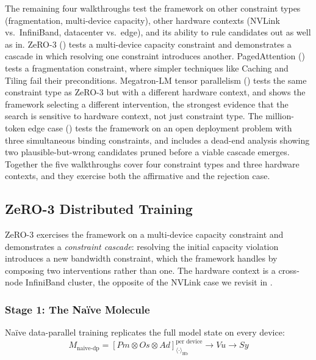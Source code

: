 \documentclass[10pt,twocolumn]{article}
\begin{document}
The remaining four walkthroughs test the framework on other constraint types (fragmentation, multi-device capacity), other hardware contexts (NVLink vs.\ InfiniBand, datacenter vs.\ edge), and its ability to rule candidates out as well as in. ZeRO-3 () tests a multi-device capacity constraint and demonstrates a cascade in which resolving one constraint introduces another. PagedAttention () tests a fragmentation constraint, where simpler techniques like Caching and Tiling fail their preconditions. Megatron-LM tensor parallelism () tests the same constraint type as ZeRO-3 but with a different hardware context, and shows the framework selecting a different intervention, the strongest evidence that the search is sensitive to hardware context, not just constraint type. The million-token edge case () tests the framework on an open deployment problem with three simultaneous binding constraints, and includes a dead-end analysis showing two plausible-but-wrong candidates pruned before a viable cascade emerges. Together the five walkthroughs cover four constraint types and three hardware contexts, and they exercise both the affirmative and the rejection case.

\subsection{ZeRO-3 Distributed Training}
\label{sec:zero-3}

ZeRO-3 \citep{rajbhandari2020} exercises the framework on a multi-device capacity constraint and demonstrates a \emph{constraint cascade}: resolving the initial capacity violation introduces a new bandwidth constraint, which the framework handles by composing two interventions rather than one. The hardware context is a cross-node InfiniBand cluster, the opposite of the NVLink case we revisit in .

\subsubsection{Stage 1: The Na\"ive Molecule}

Na\"ive data-parallel training replicates the full model state on every device:
\begin{equation*}
M_{\text{naive-dp}} = [Pm \otimes Os \otimes Ad]_{\langle \cdot \rangle_{\text{Hb}}}^{\text{per device}} \rightarrow Vu \rightarrow Sy
\end{equation*}
\end{document}
